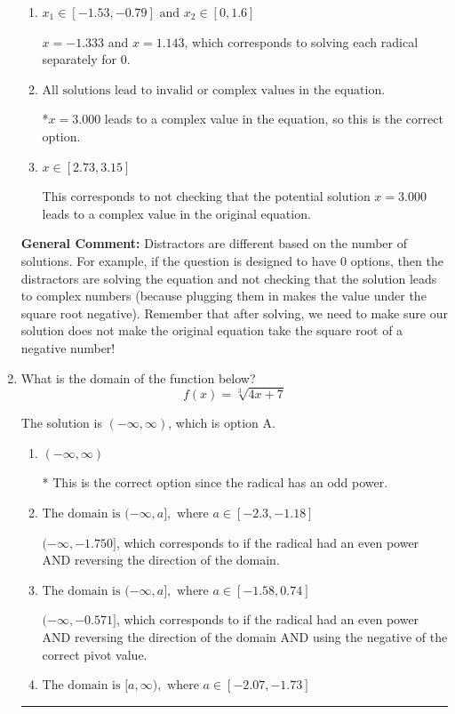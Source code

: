 \documentclass{extbook}[14pt]
\newcommand{\litem}[1]{\item #1

\rule{\textwidth}{0.4pt}}
\begin{document}
\begin{enumerate}
{\begin{enumerate}[label=\Alph*.]
$x = 1.143$ and $x = 3.000$, which corresponds to solving the equation correctly and including the value that makes the first square root 0.
\item \( x_1 \in [-1.53, -0.79] \text{ and } x_2 \in [0,1.6] \)

$x = -1.333$ and $x = 1.143$, which corresponds to solving each radical separately for 0.
\item \( \text{All solutions lead to invalid or complex values in the equation.} \)

*$x = 3.000$ leads to a complex value in the equation, so this is the correct option.
\item \( x \in [2.73,3.15] \)

This corresponds to not checking that the potential solution $x = 3.000$ leads to a complex value in the original equation.
\end{enumerate}

\textbf{General Comment:} Distractors are different based on the number of solutions. For example, if the question is designed to have 0 options, then the distractors are solving the equation and not checking that the solution leads to complex numbers (because plugging them in makes the value under the square root negative). Remember that after solving, we need to make sure our solution does not make the original equation take the square root of a negative number!
}
\litem{
What is the domain of the function below?
\[ f(x) = \sqrt[3]{4 x + 7} \]

The solution is \( (-\infty, \infty) \), which is option A.\begin{enumerate}[label=\Alph*.]
\item \( (-\infty, \infty) \)

* This is the correct option since the radical has an odd power.
\item \( \text{The domain is } (-\infty, a], \text{   where } a \in [-2.3, -1.18] \)

$(-\infty, -1.750]$, which corresponds to if the radical had an even power AND reversing the direction of the domain.
\item \( \text{The domain is } (-\infty, a], \text{   where } a \in [-1.58, 0.74] \)

$(-\infty, -0.571]$, which corresponds to if the radical had an even power AND reversing the direction of the domain AND using the negative of the correct pivot value.
\item \( \text{The domain is } [a, \infty), \text{   where } a \in [-2.07, -1.73] \)


\end{enumerate}}
\end{enumerate}
\end{document}
